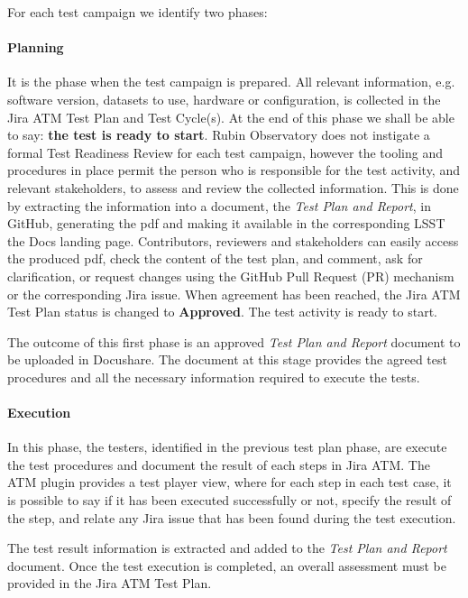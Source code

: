 For each test campaign we identify two phases:

\paragraph{Planning}
It is the phase when the test campaign is prepared. All relevant information, e.g. software version, datasets to use, hardware or configuration,
is  collected in the Jira ATM Test Plan and Test Cycle(s).
At the end of this phase we shall be able to say: \textbf{the test is ready to start}.
Rubin Observatory does not instigate a formal Test Readiness Review for each test campaign,
however the tooling and procedures in place permit the person who is responsible for the test activity, and relevant stakeholders, to assess and review the collected information.
This is done by extracting the information into a document, the \textit{Test Plan and Report}, in GitHub, generating the pdf and making it available
in the corresponding LSST the Docs landing page. Contributors, reviewers and stakeholders can easily access the produced pdf,
check the content of the test plan, and comment, ask for clarification, or request changes using the GitHub
Pull Request (PR) mechanism or the corresponding Jira issue.
When agreement has been reached, the Jira ATM Test Plan status is changed to \textbf{Approved}. The test activity is ready to start.

The outcome of this first phase is an approved \textit{Test Plan and Report} document to be uploaded in Docushare.
The document at this stage provides the agreed test procedures and all the necessary information required to execute the tests.

\paragraph{Execution}
In this phase, the testers, identified in the previous test plan phase, are  execute the test procedures and
document the result of each steps in Jira ATM.
The ATM plugin provides a test player view, where for each step in each test case, it is possible to say if it has been executed successfully or not,
specify the result of the step, and relate any Jira issue that has been found during the test execution.

The test result information is extracted and added to the \textit{Test Plan and Report} document.
Once the test execution is completed, an overall assessment must  be provided in the Jira ATM Test Plan.

